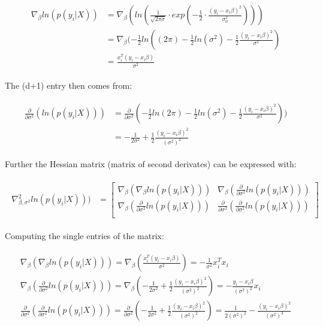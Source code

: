 \documentclass{article}
\begin{document}
\begin{align}
\begin{aligned}
\nabla_{\beta}ln(p(y_i|X))	&= \nabla_{\beta}(ln(\frac{1}{\sqrt{2\pi\sigma}} \cdot exp(- \frac{1}{2} \cdot \frac{(y_i - x_i\beta)^2}{\sigma^2_0})))\\
				 	&=  \nabla_{\beta}(-\frac{1}{2}ln((2\pi) - \frac{1}{2}ln(\sigma^2)-\frac{1}{2} \frac{(y_i - x_i \beta)^2}{\sigma^2})\\
				 	&= \frac{x_i^T(y_i - x_i\beta)}{\sigma^2}
\end{aligned}
\end{align}

The (d+1) entry then comes from:

\begin{align}
\begin{aligned}
\frac{\partial}{\partial\sigma^2}(ln(p(y_i|X))) &=  \frac{\partial}{\partial\sigma^2}(-\frac{1}{2}ln(2\pi)-\frac{1}{2}ln(\sigma^2) - \frac{1}{2} \frac{(y_i - x_i\beta)^2}{\sigma^2}))\\
								   &= -\frac{1}{2\sigma^2} + \frac{1}{2} \frac{(y_i - x_i\beta)^2}{(\sigma^2)^2}
\end{aligned}
\end{align}

Further the Hessian matrix (matrix of second derivates) can be expressed with:

\begin{align}
\begin{aligned}
\nabla_{\beta,\sigma^2}^2ln(p(y_i|X))) &=
\begin{bmatrix}
\nabla_{\beta}(\nabla_{\beta} ln (p(y_i|X)))					& \nabla_{\beta}(\frac{\partial}{\partial\sigma^2} ln (p(y_i|X)))				\\
\nabla_{\beta}(\frac{\partial}{\partial\sigma^2} ln (p(y_i|X)))	& \frac{\partial}{\partial\sigma^2}(\frac{\partial}{\partial\sigma^2} ln (p(y_i|X)))	\\
\end{bmatrix}
\end{aligned}
\end{align}

Computing the single entries of the matrix:

\begin{align}
\begin{aligned}
\nabla_{\beta}(\nabla_{\beta} ln (p(y_i|X)))	 = \nabla_{\beta} (\frac{x_i^T(y_i - x_i\beta)}{\sigma^2}) = - \frac{1}{\sigma^2}x^T_ix_i\\
\nabla_{\beta}(\frac{\partial}{\partial\sigma^2} ln (p(y_i|X))) = \nabla_{\beta} (-\frac{1}{2\sigma^2} + \frac{1}{2} \frac{(y_i - x_i\beta)^2}{(\sigma^2)^2}) = - \frac{y_i - x_i \beta}{(\sigma^2)^2}x_i\\
\frac{\partial}{\partial\sigma^2}(\frac{\partial}{\partial\sigma^2} ln (p(y_i|X))) = \frac{\partial}{\partial\sigma^2}(-\frac{1}{2\sigma^2} + \frac{1}{2} \frac{(y_i - x_i\beta)^2}{(\sigma^2)^2}) = \frac{1}{2(\sigma^2)^2} - \frac{(y_i - x_i \beta)^2}{(\sigma^2)^3}
\end{aligned}
\end{align}
\end{document}
